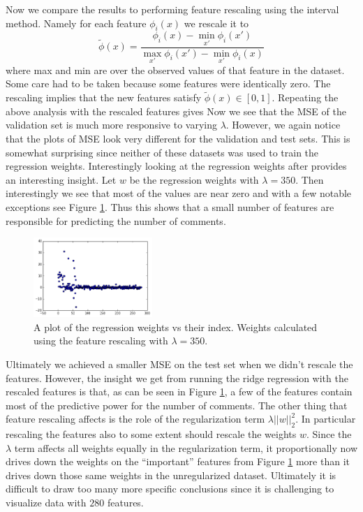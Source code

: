 \documentclass[10pt]{article}
\begin{document}
%
%

Now we compare the results to performing feature rescaling using the interval method. Namely for each feature $\phi_i(x)$ we rescale it to 
%
%
%
\begin{equation*}
\tilde{\phi}(x) = \frac{\phi_i(x) - \min_{x'}\phi_i(x')}{\max_{x'}\phi_i(x') - \min_{x'}\phi_i(x)}
\end{equation*}
 where max and min are over the observed values of that feature in the dataset. Some care had to be taken because some features were identically zero. The rescaling implies that the new features satisfy $\tilde{\phi}(x) \in [0,1]$.  Repeating the above analysis with the rescaled features gives
 Now we see that the MSE of the validation set is much more responsive to varying $\lambda$. However, we again notice that the plots of MSE look very different for the validation and test sets. This is somewhat surprising since neither of these datasets was used to train the regression weights. Interestingly looking at the regression weights after provides an interesting insight. Let $w$ be the regression weights with $\lambda = 350$. Then interestingly we see that most of the values are near zero and with a few notable exceptions see Figure \ref{reg-weights-lam-350-normalize-true}. Thus this shows that a small number of features are responsible for predicting the number of comments.
%
 \begin{figure}[h]
\centering
\includegraphics[width=0.4\textwidth]{reg-weights-lam-350-normalize-true}
\caption{A plot of the regression weights vs their index. Weights calculated using the feature rescaling with $\lambda = 350$. }
\label{reg-weights-lam-350-normalize-true}
\end{figure}
%
%
Ultimately we achieved a smaller MSE on the test set when we didn't rescale the features. However, the insight we get from running the ridge regression with the rescaled features is that, as can be seen in Figure \ref{reg-weights-lam-350-normalize-true}, a few of the features contain most of the predictive power for the number of comments. The other thing that feature rescaling affects is the role of the regularization term $\lambda ||w||_2^2$. In particular rescaling the features also to some extent should rescale the weights $w$. Since the $\lambda$ term affects all weights equally in the regularization term, it proportionally now drives down the weights on the ``important'' features from Figure \ref{reg-weights-lam-350-normalize-true} more than it drives down those same weights in the unregularized dataset. Ultimately it is difficult to draw too many more specific conclusions since it is challenging to visualize data with $280$ features.
\end{document}
